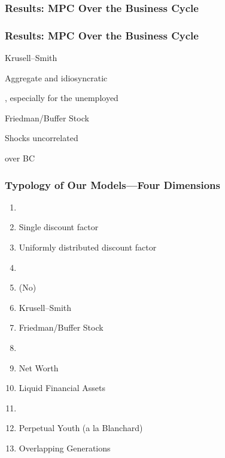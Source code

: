 \begin{frame}
\frametitle{{Results: MPC Over the Business Cycle}}
\begin{scriptsize}
\begin{table}

\end{table}
\end{scriptsize}
\end{frame}


\begin{frame}
\frametitle{{Results: MPC Over the Business Cycle}}
\begin{block}{Krusell--Smith}
\bi
\item Aggregate and idiosyncratic 
\item {}, especially for the unemployed
\ei
\end{block}
\begin{block}{Friedman/Buffer Stock}
\bi
\item Shocks uncorrelated
\item {} over BC
\ei
\end{block}
\end{frame}


\begin{frame}
\frametitle{{Typology of Our Models---{Four Dimensions}}}

\begin{block}{}\footnotesize
\begin{enumerate}
\item<0-0> 
\bi \scriptsize
\item {} Single discount factor
\item {} Uniformly distributed discount factor
\ei
\item<0-0> 
\bi \scriptsize
\item (No)
\item Krusell--Smith
\item Friedman/Buffer Stock
\ei
\item<1-> 
\bi \scriptsize
\item Net Worth
\item Liquid Financial Assets
\ei
\item<0-0> 
\bi \scriptsize
\item Perpetual Youth (a la Blanchard)
\item Overlapping Generations
\ei
\end{enumerate}
\end{block}

\end{frame}

